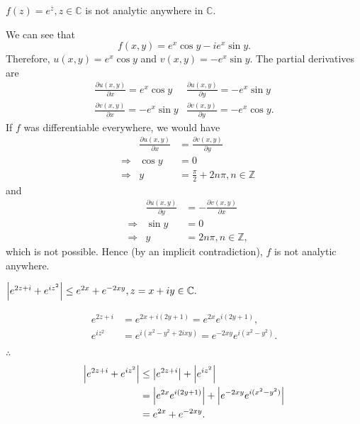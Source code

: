\documentclass[12pt]{book}
\begin{document}
\begin{exmp} 
    $f(z) = e^{\overline{z}}, z \in \mathbb{C}$ is not analytic anywhere in $\mathbb{C}.$
\end{exmp}
We can see that 
\[
    f(x, y) = e^{x}\cos y - ie^{x}\sin y.
\]
Therefore, $u(x, y) = e^{x}\cos y$ and $v(x, y) = -e^{x}\sin y$. The partial derivatives are
\[
    \begin{array}{cc}
        \frac{\partial u(x, y)}{\partial x} = e^{x}\cos y & \frac{\partial u(x, y)}{\partial y} = -e^{x}\sin y \\
        \frac{\partial v(x, y)}{\partial x} = -e^{x}\sin y & \frac{\partial v(x, y)}{\partial y} = -e^{x}\cos y.
    \end{array}
\]
If $f$ was differentiable everywhere, we would have 
\begin{align*}
    &&\frac{\partial u(x, y)}{\partial x}
        &= 
            \frac{\partial v(x, y)}{\partial y} \\
    &\Rightarrow &\cos y 
        &=
            0 \\
    &\Rightarrow &y 
        &= 
            \frac{\pi}{2} + 2n\pi, n \in \mathbb{Z}
\end{align*}
and 
\begin{align*}
    &&\frac{\partial u(x, y)}{\partial y}
        &= 
            -\frac{\partial v(x, y)}{\partial x} \\
    &\Rightarrow &\sin y 
        &=
            0 \\
    &\Rightarrow &y 
        &= 
            2n\pi, n \in \mathbb{Z},
\end{align*}
which is not possible. Hence (by an implicit contradiction), $f$ is not analytic anywhere.

\begin{exmp}
    $\left\lvert e^{2z + i} + e^{iz^2} \right\rvert \leq e^{2x} + e^{-2xy}, z = x + iy \in \mathbb{C}.$
\end{exmp}
\begin{align*}
    e^{2z + i}  
        &= 
            e^{2x + i(2y + 1)}
        = 
            e^{2x}e^{i(2y + 1)}, \\
    e^{iz^2}
        &=
            e^{i(x^2 - y^2 + 2ixy)}
        =
            e^{-2xy}e^{i(x^2 - y^2)}.\\   
\end{align*}
$\therefore$
\begin{align*}
    \left\lvert e^{2z + i} + e^{iz^2} \right\rvert
        &\leq
            \left\lvert e^{2z + i} \right\rvert + \left\lvert e^{iz^2} \right\rvert \\
        &=
            \left\lvert e^{2x}e^{i(2y + 1)} \right\rvert + \left\lvert e^{-2xy}e^{i(x^2 - y^2)} \right\rvert \\
        &=
            e^{2x} + e^{-2xy}.
\end{align*}
\end{document}
